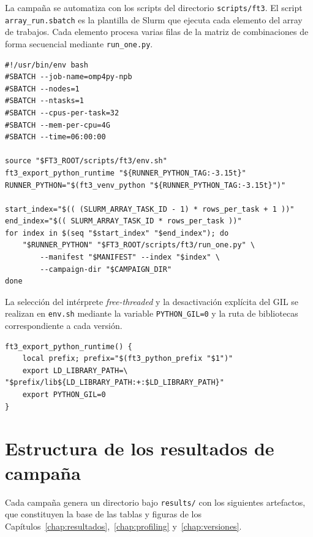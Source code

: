 La campaña se automatiza con los scripts del directorio \texttt{scripts/ft3}. El
script \texttt{array\_run.sbatch} es la plantilla de Slurm que ejecuta cada
elemento del array de trabajos. Cada elemento procesa varias filas de la matriz
de combinaciones de forma secuencial mediante \texttt{run\_one.py}.

\begin{verbatim}
#!/usr/bin/env bash
#SBATCH --job-name=omp4py-npb
#SBATCH --nodes=1
#SBATCH --ntasks=1
#SBATCH --cpus-per-task=32
#SBATCH --mem-per-cpu=4G
#SBATCH --time=06:00:00

source "$FT3_ROOT/scripts/ft3/env.sh"
ft3_export_python_runtime "${RUNNER_PYTHON_TAG:-3.15t}"
RUNNER_PYTHON="$(ft3_venv_python "${RUNNER_PYTHON_TAG:-3.15t}")"

start_index="$(( (SLURM_ARRAY_TASK_ID - 1) * rows_per_task + 1 ))"
end_index="$(( SLURM_ARRAY_TASK_ID * rows_per_task ))"
for index in $(seq "$start_index" "$end_index"); do
    "$RUNNER_PYTHON" "$FT3_ROOT/scripts/ft3/run_one.py" \
        --manifest "$MANIFEST" --index "$index" \
        --campaign-dir "$CAMPAIGN_DIR"
done
\end{verbatim}

La selección del intérprete \emph{free-threaded} y la desactivación explícita
del GIL se realizan en \texttt{env.sh} mediante la variable
\texttt{PYTHON\_GIL=0} y la ruta de bibliotecas correspondiente a cada versión.

\begin{verbatim}
ft3_export_python_runtime() {
    local prefix; prefix="$(ft3_python_prefix "$1")"
    export LD_LIBRARY_PATH=\
"$prefix/lib${LD_LIBRARY_PATH:+:$LD_LIBRARY_PATH}"
    export PYTHON_GIL=0
}
\end{verbatim}


\chapter{Estructura de los resultados de campaña}
\label{anexo:resultados-estructura}

Cada campaña genera un directorio bajo \texttt{results/} con los siguientes
artefactos, que constituyen la base de las tablas y figuras de los
Capítulos~\ref{chap:resultados},~\ref{chap:profiling}
y~\ref{chap:versiones}.

